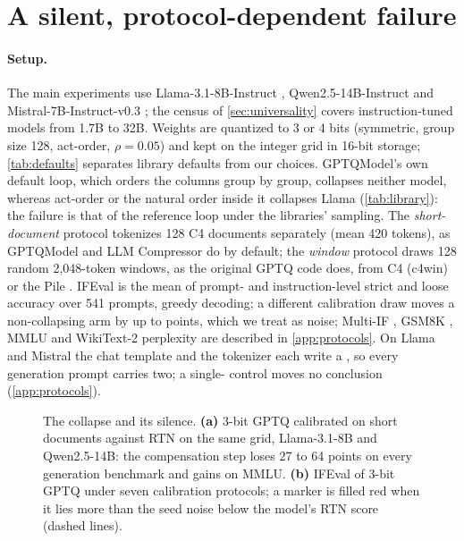 \section{A silent, protocol-dependent failure}
\label{sec:phenomenon}
\paragraph{Setup.}
The main experiments use Llama-3.1-8B-Instruct \citep{grattafiori2024llama3}, Qwen2.5-14B-Instruct \citep{qwen2025qwen25} and Mistral-7B-Instruct-v0.3 \citep{jiang2023mistral}; the census of \cref{sec:universality} covers \nCensus{} instruction-tuned models from 1.7B to 32B.
Weights are quantized to 3 or 4 bits (symmetric, group size 128, act-order, $\rho=0.05$) and kept on the integer grid in 16-bit storage; \cref{tab:defaults} separates library defaults from our choices.
GPTQModel's own default loop, which orders the columns group by group, collapses neither model, whereas act-order or the natural order inside it collapses Llama (\cref{tab:library}): the failure is that of the reference loop under the libraries' sampling.
The \emph{short-document} protocol tokenizes 128 C4 documents \citep{raffel2020c4} separately (mean 420 tokens), as GPTQModel \citep{gptqmodel} and LLM Compressor \citep{llmcompressor} do by default; the \emph{window} protocol draws 128 random 2,048-token windows, as the original GPTQ code does, from C4 (c4win) or the Pile \citep{gao2021pile}.
IFEval \citep{zhou2023ifeval} is the mean of prompt- and instruction-level strict and loose accuracy over 541 prompts, greedy decoding; a different calibration draw moves a non-collapsing arm by up to \SeedNoise{} points, which we treat as noise; Multi-IF \citep{he2024multiif}, GSM8K \citep{cobbe2021gsm8k}, MMLU \citep{hendrycks2021mmlu} and WikiText-2 perplexity \citep{merity2017wikitext} are described in \cref{app:protocols}.
On Llama and Mistral the chat template and the tokenizer each write a \bos{}, so every generation prompt carries two; a single-\bos{} control moves no conclusion (\cref{app:protocols}).

\begin{figure}[t]
\begin{center}
\end{center}
\caption{The collapse and its silence. \textbf{(a)} 3-bit GPTQ calibrated on short documents against RTN on the same grid, Llama-3.1-8B and Qwen2.5-14B: the compensation step loses 27 to 64 points on every generation benchmark and gains on MMLU. \textbf{(b)} IFEval of 3-bit GPTQ under seven calibration protocols; a marker is filled red when it lies more than the seed noise below the model's RTN score (dashed lines).}
\label{fig:bars}
\end{figure}
